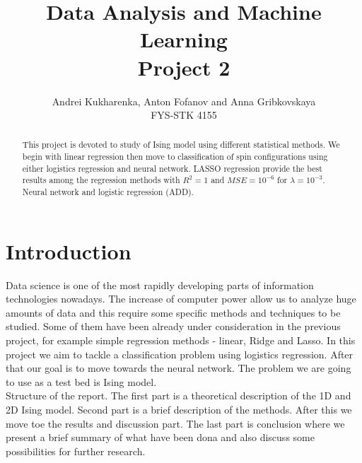 \documentclass[10pt]{article}
\begin{document}
\setlength\parindent{1pt}
\title{Data Analysis and Machine Learning \\
	Project 2\\ }
\author{Andrei Kukharenka, Anton Fofanov and Anna Gribkovskaya \\  
	FYS-STK 4155 
}
\date{}

\maketitle

\begin{abstract}
	This project is devoted to study of Ising model using different statistical methods. We begin with linear regression then move to classification of spin configurations using either logistics regression and neural network. LASSO regression provide the best results among the regression methods with $R^2=1$ and $MSE=10^{-6}$ for $\lambda=10^{-3}$.\\
	Neural network and logistic regression (ADD).
\end{abstract}
\newpage
\tableofcontents
\section{Introduction}

Data science is one of the most rapidly developing parts of information technologies nowadays. The increase of computer power allow us to analyze huge amounts of data and this require some specific methods and techniques to be studied. Some of them have been already under consideration in the previous project, for example simple regression methods - linear, Ridge and Lasso. In this project we aim to tackle a classification problem using logistics regression. After that our goal is to move towards the neural network. The problem we are going to use as a test bed is Ising model. \\

Structure of the report. The first part is a theoretical description of the 1D and 2D Ising model. Second part is a brief description of the methods. After this we move toe the results and discussion part. The last part is conclusion where we present a brief summary of what have been dona and also discuss some possibilities for further research.
\end{document}
